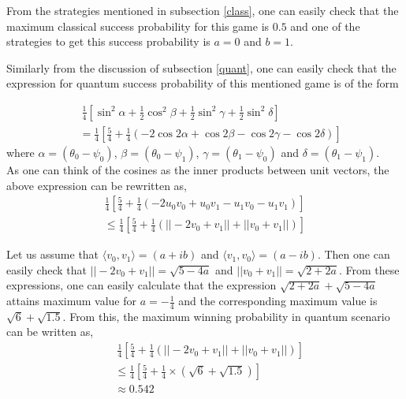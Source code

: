 \documentclass[]{svjour3}
\begin{document}
From the strategies mentioned in subsection \ref{class}, one can easily check that the maximum classical success probability for this game is $0.5$ and one of the strategies to get this success probability is $a=0$ and $b=1$.

Similarly from the discussion of subsection \ref{quant}, one can easily check that the expression for quantum success probability of this mentioned game is of the form

\begin{align*}
~ &~ \frac{1}{4}\left[\sin^2{\alpha} + \frac{1}{2} \cos^2 {\beta} + \frac{1}{2}\sin^2 {\gamma} + \frac{1}{2} \sin^2 {\delta}\right]\\
~ &= \frac{1}{4}\left[\frac{5}{4} + \frac{1}{4}(-2\cos{2\alpha} + \cos{2\beta} - \cos{2\gamma} - \cos{2\delta})\right]
\end{align*}
where $\alpha=(\theta_0 - \psi_0)$, $\beta=(\theta_0 - \psi_1)$, $\gamma=(\theta_1 - \psi_0)$ and 
$\delta=(\theta_1 - \psi_1)$. \\ 
As one can think of the cosines as the inner products between unit vectors, the above expression can be rewritten as,
\begin{align*}
\frac{1}{4}\left[\frac{5}{4} + \frac{1}{4}(-2u_{0}v_{0} + u_{0}v_{1} - u_{1}v_{0} - u_{1}v_{1})\right]
\end{align*}
\begin{align*}
\le \frac{1}{4} \left[\frac{5}{4} + \frac{1}{4}\left(||-2v_{0} + v_{1}|| +  ||v_{0} + v_{1}||\right)\right]
\end{align*}

Let us assume that $\langle v_0, v_1 \rangle = (a + ib)$ and $\langle v_1, v_0 \rangle = (a - ib)$. Then one can easily check that $||-2v_0 + v_1|| = \sqrt{5 - 4a}$ and $||v_0 + v_1|| = \sqrt{2 + 2a}$. From these expressions, one can easily calculate that the expression $\sqrt{2 + 2a} + \sqrt{5 - 4a}$ attains maximum value for $a = -\frac{1}{4}$ and the corresponding maximum value is $\sqrt{6}+\sqrt{1.5}$. From this, the maximum winning probability in quantum scenario can be written as,
\begin{align*}
&~ \frac{1}{4} \left[\frac{5}{4} + \frac{1}{4}\left(||-2v_{0} + v_{1}|| + ||v_{0} + v_{1}||\right)\right]\\
&\leq \frac{1}{4} \left[\frac{5}{4} + \frac{1}{4} \times (\sqrt{6} + \sqrt{1.5})\right]\\
&\approx 0.542
\end{align*}
\end{document}
